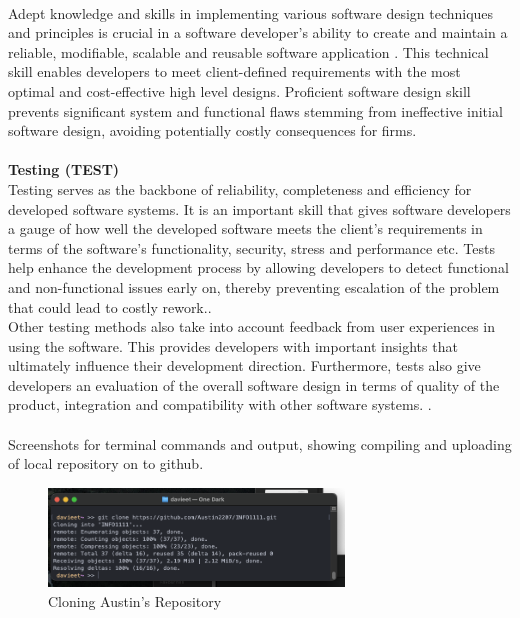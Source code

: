 \documentclass[a4paper, 11pt]{report}
\begin{document}
\\[1em]
 Adept knowledge and skills in implementing various software design techniques and principles is crucial in a software developer’s ability to create and maintain a reliable, modifiable, scalable and reusable software application \cite{SWDN1}\cite{SWDN2}. This technical skill enables developers to meet client-defined requirements with the most optimal and cost-effective high level designs. Proficient software design skill prevents significant system and functional flaws stemming from ineffective initial software design, avoiding potentially costly consequences for firms.\cite{SWDN1}
\\[1em]
\\[1em]
\noindent \textbf {Testing (TEST)}
\\[1em]
Testing serves as the backbone of reliability, completeness and efficiency for developed software systems. It is an important skill that gives software developers a gauge of how well the developed software meets the client’s requirements in terms of the software’s functionality, security, stress and performance etc.\cite{TEST1}  Tests help enhance the development process by allowing developers to detect functional and non-functional issues early on, thereby preventing escalation of the problem that could lead to costly rework.\cite{TEST2}\cite{TEST3}.
\\[1em]
Other testing methods also take into account feedback from user experiences in using the software. This provides developers with important insights that ultimately influence their development direction. Furthermore, tests also give developers an evaluation of the overall software design in terms of quality of the product, integration and compatibility with other software systems.
\cite{TEST2}.
\\[1em]
\\[1em]
Screenshots for terminal commands and output, showing compiling and uploading of local repository on to github. 

\begin{figure}[H]
    \centering
    \includegraphics[width=0.7\textwidth]{proof1}
    \caption{Cloning Austin's Repository}
\end{figure}
\end{document}
